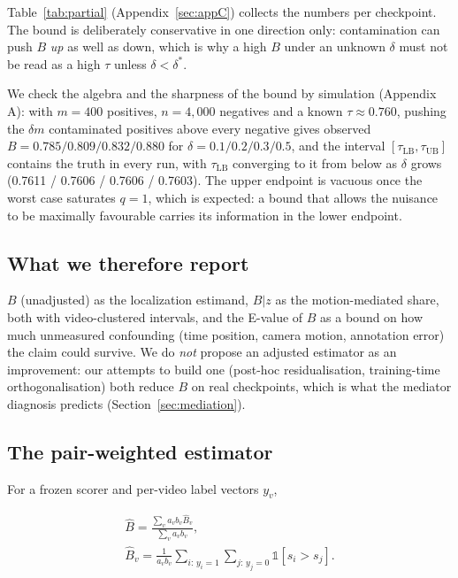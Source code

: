 \documentclass[number,preprint,12pt]{elsarticle}
\begin{document}
Table~\ref{tab:partial} (Appendix~\ref{sec:appC}) collects the numbers per
checkpoint. The bound is deliberately conservative in one direction only:
contamination can push \(B\) \emph{up} as well as down, which is why a high \(B\) under
an unknown \(\delta\) must not be read as a high \(\tau\) unless \(\delta<\delta^{*}\).

We check the algebra and the sharpness of the bound by simulation (Appendix A):
with \(m=400\) positives, \(n=4{,}000\) negatives and a known \(\tau\approx0.760\), pushing
the \(\delta m\) contaminated positives above every negative gives observed
\(B=0.785/0.809/0.832/0.880\) for \(\delta=0.1/0.2/0.3/0.5\), and the
interval \([\tau_{\mathrm{LB}},\tau_{\mathrm{UB}}]\) contains the truth in every run, with \(\tau_{\mathrm{LB}}\) converging to
it from below as \(\delta\) grows (0.7611 / 0.7606 / 0.7606 / 0.7603). The upper endpoint
is vacuous once the worst case saturates \(q=1\), which is expected: a bound that
allows the nuisance to be maximally favourable carries its information in the
lower endpoint.

\subsection{What we therefore report}\label{sec:report}

\(B\) (unadjusted) as the localization estimand, \(B|z\) as the motion-mediated
share, both with video-clustered intervals, and the E-value of \(B\) as a bound on
how much unmeasured confounding (time position, camera motion, annotation
error) the claim could survive. We do \emph{not} propose an adjusted estimator as an
improvement: our attempts to build one (post-hoc residualisation, training-time
orthogonalisation) both reduce \(B\) on real checkpoints, which is what the
mediator diagnosis predicts (Section~\ref{sec:mediation}).

\subsection{The pair-weighted estimator}\label{sec:pairw}

For a frozen scorer and per-video label vectors \(y_v\),

\begin{equation}
\begin{gathered}\hat{B}=\frac{\sum_v a_v b_v \hat{B}_v}{\sum_v a_v b_v},\\ \hat{B}_v=\frac{1}{a_v b_v}\sum_{i:\,y_i=1}\sum_{j:\,y_j=0}\mathbb{1}[s_i>s_j].\end{gathered}
\end{equation}
\end{document}
